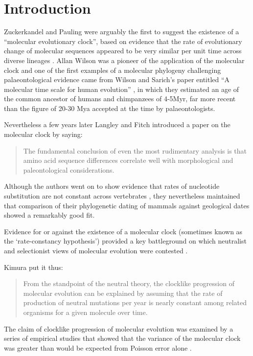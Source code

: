 \section{Introduction} 
Zuckerkandel and Pauling were arguably the first to suggest the existence of a ``molecular evolutionary clock'', based on evidence that the rate of evolutionary change of molecular sequences appeared to be very similar per unit time across diverse lineages \cite{zuckerkandl1965}. Allan Wilson was a pioneer of the application of the molecular clock and one of the first examples of a molecular phylogeny challenging palaeontological evidence came from Wilson and Sarich's paper entitled ``A molecular time scale for human evolution'' \cite{WilsonSarich1969}, in which they estimated an age of the common ancestor of humans and chimpanzees of 4-5Myr, far more recent than the figure of 20-30 Mya accepted at the time by palaeontologists.

Nevertheless a few years later Langley and Fitch \cite{LangleyFitch1974} introduced a paper on the molecular clock by saying:

\begin{quotation}
The fundamental conclusion of even the most rudimentary analysis is that amino acid sequence differences correlate well with morphological and paleontological considerations.
\end{quotation}

Although the authors went on to show evidence that rates of nucleotide substitution are not constant across vertebrates \cite{LangleyFitch1974}, they nevertheless maintained that comparison of their phylogenetic dating of mammals against geological dates showed a remarkably good fit. 

Evidence for or against the existence of a molecular clock (sometimes known as the `rate-constancy hypothesis') provided a key battleground on which neutralist and selectionist views of molecular evolution were contested \cite{Kimura1987}.

Kimura \cite{Kimura1987} put it thus:

\begin{quotation}
From the standpoint of the neutral theory, the clocklike progression of molecular evolution can be explained by assuming that the rate of production of neutral mutations per year is nearly constant among related organisms for a given molecule over time. 
\end{quotation}
 
The claim of clocklike progression of molecular evolution was examined by a series of empirical studies that showed that the variance of the molecular clock was greater than would be expected from Poisson error alone \cite{LangleyFitch1974}.

  
  
  
  
  
  
  
  
  
  
  
  
  
  
  
  
  
  
  
  
  
  